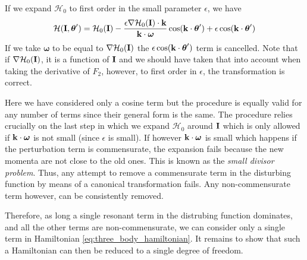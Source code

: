 \documentclass[ twoside,openright,titlepage,numbers=noenddot,headinclude,%
                footinclude=true,cleardoublepage=empty,abstractoff, %
                BCOR=5mm,paper=a4,fontsize=11pt,%
                american,%
                ]{scrreprt}
\begin{document}
If we expand $\mathcal{H}_0$ to first order in the small parameter 
$\epsilon$, we have
\begin{equation}
    \mathcal{H}(\boldsymbol{\mathbf{I}},\boldsymbol{\theta}')=\mathcal{H}_0(\boldsymbol{\mathbf{I}})
    - \frac{\epsilon\nabla \mathcal{H}_0(\boldsymbol{\mathbf{I}})\cdot\boldsymbol{\mathbf{k}}}{
        \boldsymbol{\mathbf{k}}\cdot\boldsymbol{\omega}} \cos(\boldsymbol{\mathbf{k}}\cdot
    \boldsymbol{\theta}')+\epsilon\cos(\boldsymbol{\mathbf{k}}\cdot\boldsymbol{\theta}')
\end{equation}
If we take $\boldsymbol{\omega}$ to be equal to $\nabla\mathcal{H}_0(\boldsymbol{\mathbf{I}})$
the $\epsilon\cos(\boldsymbol{\mathbf{k}}\cdot\boldsymbol{\theta}')$ term is cancelled. Note
that if $\nabla\mathcal{H}_0(\boldsymbol{\mathbf{I}})$, it is a function of $\boldsymbol{\mathbf{I}}$ and 
we should have taken that into account when taking the derivative of $F_2$, 
however, to first order in $\epsilon$, the transformation is correct.

Here we have 
considered only a cosine term but the procedure is equally valid for any
number of terms since their general form is the same. The procedure 
relies crucially on the last step in which we expand $\mathcal{H}_0$ around
$\boldsymbol{\mathbf{I}}$ which is only allowed if $\boldsymbol{\mathbf{k}}\cdot\boldsymbol{\omega}$ is not
small (since $\epsilon$ is small). If however $\boldsymbol{\mathbf{k}}\cdot\boldsymbol{\omega}$
is small which happens if the perturbation term is commensurate, the expansion
fails because the new momenta are not close to the old ones. This is known
as the \emph{small divisor problem}. Thus, any attempt to remove a 
commensurate term in the disturbing function by means of a canonical transformation
fails. Any non-commensurate term however, can be consistently removed.

Therefore, as long a single resonant term in the distrubing function dominates, and
all the other terms are non-commensurate, we can consider only a single term
in Hamiltonian \ref{eq:three_body_hamiltonian}. It remains to show that 
such a Hamiltonian can then be reduced to a single degree of freedom.
\end{document}
